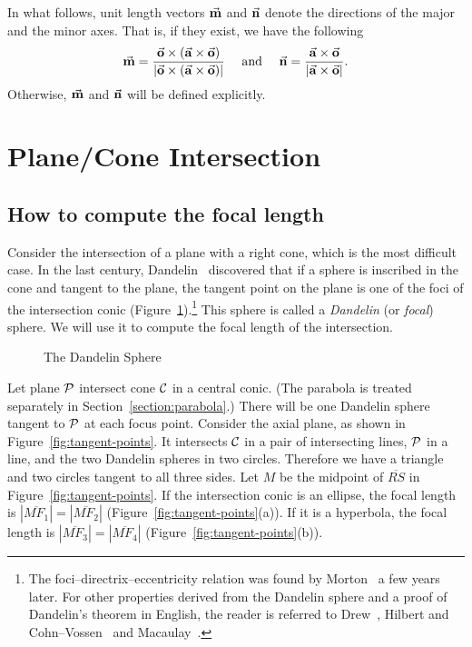      In what follows, unit length vectors $\vec{\bf m}$ and $\vec{\bf n}$ denote
the directions of the major and the minor axes.  That is, if they exist, 
we have the following
\[     \vec{\bf m} = \frac{\vec{\bf o}\times(\vec{\bf a}\times\vec{\bf o})}
                        {|\vec{\bf o}\times(\vec{\bf a}\times\vec{\bf o})|}
     \ \ \ \ \mbox{and}\ \ \ \  
     \vec{\bf n} = \frac{\vec{\bf a}\times\vec{\bf o}}
                        {|\vec{\bf a}\times\vec{\bf o}|}.   \]
Otherwise, $\vec{\bf m}$ and $\vec{\bf n}$ will be defined explicitly.



\section{Plane/Cone Intersection}
\label{section:cone}

\subsection{How to compute the focal length}
\label{ss:focal}

Consider the intersection of a plane with a right cone, which
is the most difficult case.
In the last century, Dandelin~\cite{dandelin:1822} discovered that if a 
sphere is inscribed in the cone and tangent to the plane, the tangent point 
on the plane is one of the foci of the intersection conic 
(Figure~\ref{dandelin-sphere}).\footnote{The foci--directrix--eccentricity 
     relation was found by Morton~\cite{morton:1830} a few years later.
     For other properties derived from the Dandelin
     sphere and a proof of Dandelin's theorem in English,
     the reader is referred to
     Drew~\cite{drew:1875}, Hilbert and Cohn--Vossen~\cite{hilbert:1983}
     and Macaulay~\cite{macaulay:1895}.}
This sphere is called a {\em Dandelin} (or {\em focal}) sphere. 
We will use it to compute the focal length of the intersection.
\begin{figure}
\vspace{4.5cm}
\caption{The Dandelin Sphere}
\label{dandelin-sphere}
\end{figure}

Let plane ${\cal P}$ intersect cone ${\cal C}$ in a central conic.  
(The parabola is treated separately in Section~\ref{section:parabola}.)
There will be one Dandelin sphere tangent to ${\cal P}$ at each focus point.  
Consider the axial plane, as shown in Figure~\ref{fig:tangent-points}.
It intersects ${\cal C}$ in a pair of intersecting lines, ${\cal P}$ in a 
line, and the two Dandelin spheres in two circles.  
Therefore we have a triangle and two circles tangent to all three sides.
Let $M$ be the midpoint of $\overline{RS}$ in Figure~\ref{fig:tangent-points}.
If the intersection conic is an ellipse, the focal length is 
$|\overline{MF_1}|=|\overline{MF_2}|$ (Figure~\ref{fig:tangent-points}(a)).
If it is a hyperbola, the focal length is $|\overline{MF_3}|=|\overline{MF_4}|$
(Figure~\ref{fig:tangent-points}(b)).

